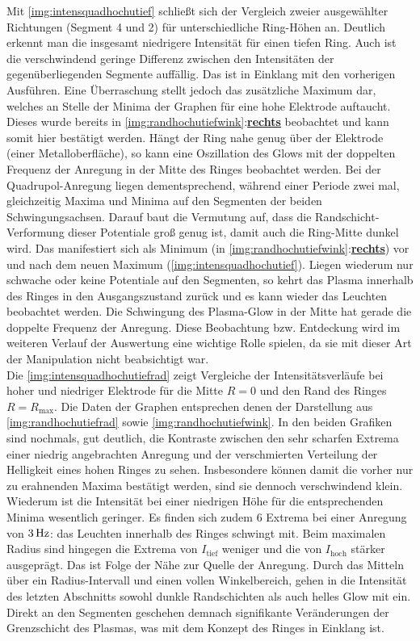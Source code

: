 \documentclass[numbers=noenddot,a4paper,notitlepage,twoside,BCOR15mm]{scrbook}
\newcommand{\ix}[1]{_\text{#1}}
\newcommand{\fett}[1]{\textbf{#1}}
\begin{document}
					Mit \ref{img:intensquadhochutief} schließt sich der Vergleich zweier ausgewählter Richtungen (Segment 4 und 2) für unterschiedliche Ring-Höhen an. Deutlich erkennt man die insgesamt niedrigere Intensität für einen tiefen Ring. Auch ist die verschwindend geringe Differenz zwischen den Intensitäten der gegenüberliegenden Segmente auffällig. Das ist in Einklang mit den vorherigen Ausführen. Eine Überraschung stellt jedoch das zusätzliche Maximum dar, welches an Stelle der Minima der Graphen für eine hohe Elektrode auftaucht. Dieses wurde bereits in \ref{img:randhochutiefwink}:\underline{\fett{rechts}} beobachtet und kann somit hier bestätigt werden. Hängt der Ring nahe genug über der Elektrode (einer Metalloberfläche), so kann eine Oszillation des Glows mit der doppelten Frequenz der Anregung in der Mitte des Ringes beobachtet werden. Bei der Quadrupol-Anregung liegen dementsprechend, während einer Periode zwei mal, gleichzeitig Maxima und Minima auf den Segmenten der beiden Schwingungsachsen. Darauf baut die Vermutung auf, dass die Randschicht-Verformung dieser Potentiale groß genug ist, damit auch die Ring-Mitte dunkel wird. Das manifestiert sich als Minimum (in \ref{img:randhochutiefwink}:\underline{\fett{rechts}}) vor und nach dem neuen Maximum (\ref{img:intensquadhochutief}). Liegen wiederum nur schwache oder keine Potentiale auf den Segmenten, so kehrt das Plasma innerhalb des Ringes in den Ausgangszustand zurück und es kann wieder das Leuchten beobachtet werden. Die Schwingung des Plasma-Glow in der Mitte hat gerade die doppelte Frequenz der Anregung. Diese Beobachtung bzw. Entdeckung wird im weiteren Verlauf der Auswertung eine wichtige Rolle spielen, da sie mit dieser Art der Manipulation nicht beabsichtigt war.\\
					Die \ref{img:intensquadhochutiefrad} zeigt Vergleiche der Intensitätsverläufe bei hoher und niedriger Elektrode für die Mitte $R=0$ und den Rand des Ringes $R=R\ix{max}$. Die Daten der Graphen entsprechen denen der Darstellung aus \ref{img:randhochutiefrad} sowie \ref{img:randhochutiefwink}. In den beiden Grafiken sind nochmals, gut deutlich, die Kontraste zwischen den sehr scharfen Extrema einer niedrig angebrachten Anregung und der verschmierten Verteilung der Helligkeit eines hohen Ringes zu sehen. Insbesondere können damit die vorher nur zu erahnenden Maxima bestätigt werden, sind sie dennoch verschwindend klein. Wiederum ist die Intensität bei einer niedrigen Höhe für die entsprechenden Minima wesentlich geringer. Es finden sich zudem 6 Extrema bei einer Anregung von $\unit[3]{Hz}$: das Leuchten innerhalb des Ringes schwingt mit. Beim maximalen Radius sind hingegen die Extrema von $I\ix{tief}$ weniger und die von $I\ix{hoch}$ stärker ausgeprägt. Das ist Folge der Nähe zur Quelle der Anregung. Durch das Mitteln über ein Radius-Intervall und einen vollen Winkelbereich, gehen in die Intensität des letzten Abschnitts sowohl dunkle Randschichten als auch helles Glow mit ein. Direkt an den Segmenten geschehen demnach signifikante Veränderungen der Grenzschicht des Plasmas, was mit dem Konzept des Ringes in Einklang ist.
\end{document}
